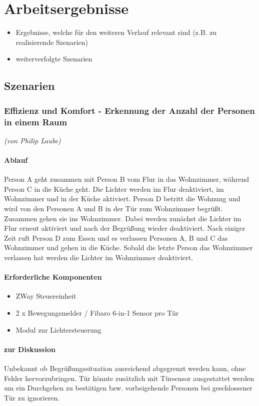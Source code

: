 \chapter{Arbeitsergebnisse}
\begin{itemize}
	\item Ergebnisse, welche für den weiteren Verlauf relevant sind (z.B. zu realisierende Szenarien)
	\item weiterverfolgte Szenarien
\end{itemize}

\section{Szenarien}

\subsection{Effizienz und Komfort - Erkennung der Anzahl der Personen in einem Raum}
\emph{(von Philip Laube)}
\subsubsection{Ablauf}
Person A geht zusammen mit Person B vom Flur in das Wohnzimmer, während Person C in die Küche geht.
Die Lichter werden im Flur deaktiviert, im Wohnzimmer und in der Küche aktiviert.
Person D betritt die Wohnung und wird von den Personen A und B in der Tür zum Wohnzimmer begrüßt. Zusammen gehen sie ins Wohnzimmer.
Dabei werden zunächst die Lichter im Flur erneut aktiviert und nach der Begrüßung wieder deaktiviert.
Nach einiger Zeit ruft Person D zum Essen und es verlassen Personen A, B und C das Wohnzimmer und gehen in die Küche.
Sobald die letzte Person das Wohnzimmer verlassen hat werden die Lichter im Wohnzimmer deaktiviert.

\subsubsection{Erforderliche Komponenten}
\begin{itemize}
	\item ZWay Steuereinheit
	\item 2 x Bewegungsmelder / Fibaro 6-in-1 Sensor pro Tür
	\item Modul zur Lichtersteuerung
\end{itemize}

\subsubsection{zur Diskussion}
Unbekannt ob Begrüßungssituation ausreichend abgegrenzt werden kann, ohne Fehler hervorzubringen.
Tür könnte zusätzlich mit Türsensor ausgestattet werden um ein Durchgehen zu bestätigen bzw. vorbeigehende Personen bei geschlossener Tür zu ignorieren.

